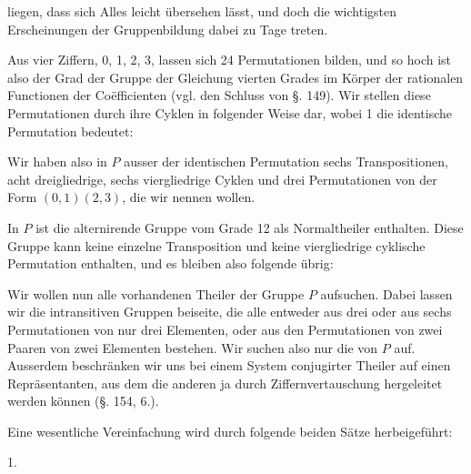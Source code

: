 liegen, dass sich Alles leicht übersehen lässt, und doch die wichtigsten Erscheinungen der Gruppenbildung dabei zu Tage treten.

Aus vier Ziffern, 0, 1, 2, 3, lassen sich 24 Permutationen bilden, und so hoch ist also der Grad der  Gruppe der  Gleichung vierten Grades im Körper der rationalen Functionen der Co\"efficienten (vgl. den Schluss von §. 149). Wir stellen diese Permutationen durch ihre Cyklen in folgender Weise dar, wobei 1 die identische Permutation bedeutet:

Wir haben also in $P$ ausser der identischen Permutation sechs Transpositionen, acht dreigliedrige, sechs viergliedrige Cyklen und drei Permutationen von der Form $(0,1)(2,3)$, die wir  nennen wollen.

In $P$ ist die alternirende Gruppe vom Grade 12 als Normaltheiler enthalten. Diese Gruppe kann keine einzelne Transposition und keine viergliedrige cyklische Permutation enthalten, und es bleiben also folgende übrig:

Wir wollen nun alle vorhandenen Theiler der Gruppe $P$ aufsuchen. Dabei lassen wir die intransitiven Gruppen beiseite, die alle entweder aus drei oder aus sechs Permutationen von nur drei Elementen, oder aus den Permutationen von zwei Paaren von zwei Elementen bestehen. Wir suchen also nur die  von $P$ auf. Ausserdem beschränken wir uns bei einem System conjugirter Theiler auf einen Repräsentanten, aus dem die anderen ja durch Ziffernvertauschung hergeleitet werden können (§. 154, 6.).

Eine wesentliche Vereinfachung wird durch folgende beiden Sätze herbeigeführt:

1. 
